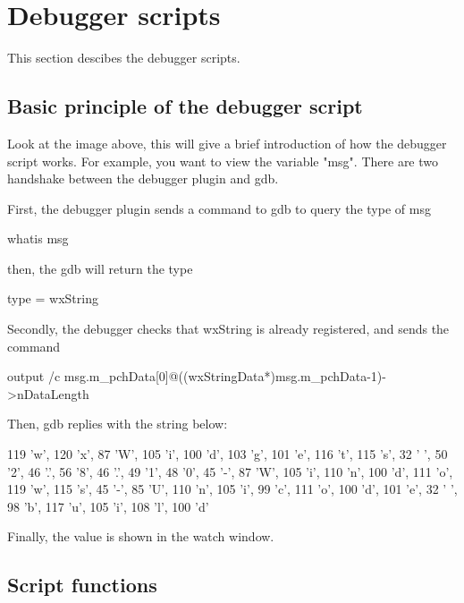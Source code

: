 \section{Debugger scripts}\label{sec:debugger_scripts}
This section descibes the debugger scripts.
\subsection{Basic principle of the debugger script}


Look at the image above, this will give a brief introduction of how the debugger script works. For example, you want to view the variable "msg". There are two handshake between the debugger plugin and gdb.

First, the debugger plugin sends a command to gdb to query the type of msg

\begin{code}
whatis msg
\end{code}

then, the gdb will return the type

\begin{code}
type = wxString
\end{code}

Secondly, the debugger checks that wxString is already registered, and sends the command

\begin{code}
output /c msg.m_pchData[0]@((wxStringData*)msg.m_pchData-1)->nDataLength
\end{code}

Then, gdb replies with the string below:

\begin{code}
{119 'w', 120 'x', 87 'W', 105 'i', 100 'd', 103 'g', 101 'e', 116 't', 
115 's', 32 ' ', 50 '2', 46 '.', 56 '8', 46 '.', 49 '1', 48 '0', 45 '-', 
87 'W', 105 'i', 110 'n', 100 'd', 111 'o', 119 'w', 115 's', 45 '-', 
85 'U', 110 'n', 105 'i', 99 'c', 111 'o', 100 'd', 101 'e', 32 ' ', 
98 'b', 117 'u', 105 'i', 108 'l', 100 'd'}
\end{code}

Finally, the value is shown in the watch window.

\subsection{Script functions}

